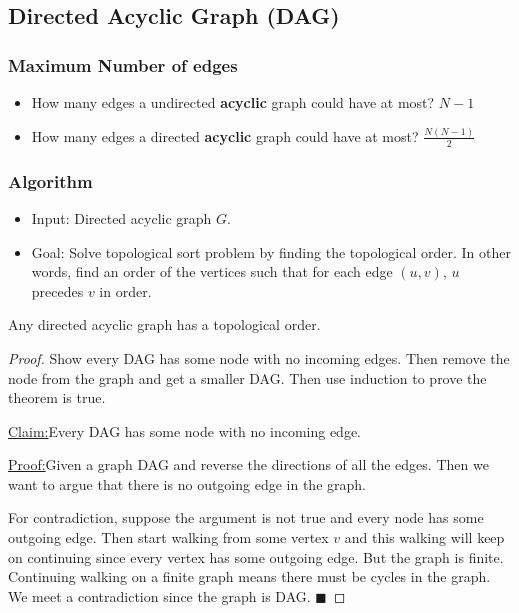 \documentclass[en,hazy,blue,screen,14pt]{elegantnote}
\newenvironment{claim}[1]{\par\noindent\underline{Claim:}\space#1}{}
\newenvironment{claimproof}[1]{\par\noindent\underline{Proof:}\space#1}{\hfill $\blacksquare$}
\begin{document}
\subsection{Directed Acyclic Graph (DAG)}
\subsubsection{Maximum Number of edges}
\begin{itemize}
\item How many edges a undirected \textbf{acyclic} graph could have at most? 
$N-1$
\item How many edges a directed \textbf{acyclic} graph could have at most? 
$\frac{N(N-1)}{2}$
\end{itemize}
\subsubsection{Algorithm}
\begin{itemize}
 \item Input: Directed acyclic graph $G$.
 \item Goal: Solve topological sort problem by finding the topological order. 
In other words, find an order of the vertices such that for each edge $(u, v)$, 
$u$ precedes $v$ in order.
\end{itemize}
\begin{theorem}
 Any directed acyclic graph has a topological order.
\end{theorem}

\begin{proof}
Show every DAG has some node with no incoming edges. Then remove the node from 
the graph and get a smaller DAG. Then use induction to prove the theorem is 
true.

\begin{claim}
Every DAG has some node with no incoming edge.
\end{claim}
\begin{claimproof}
Given a graph DAG and reverse the directions of all the edges. Then we want to 
argue that there is no outgoing edge in the graph.

For contradiction, suppose the argument is not true and every node has some 
outgoing edge. Then start walking from some vertex $v$ and this walking will 
keep on continuing since every vertex has some outgoing edge. But the graph is 
finite. Continuing walking on a finite graph means there must be cycles in the 
graph. We meet a contradiction since the graph is DAG.
\end{claimproof}
\end{proof}
\end{document}

